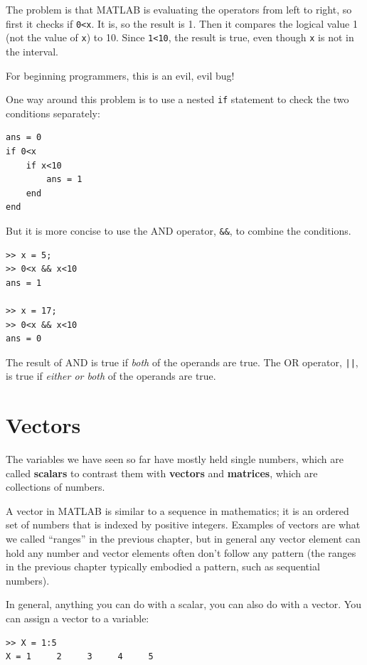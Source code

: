 \documentclass[
]{book}
\begin{document}
The problem is that MATLAB is evaluating the operators from left
to right, so first it checks if {\tt 0<x}.  It is, so the result
is 1.  Then it compares the logical value 1 (not the value of
{\tt x}) to 10.  Since {\tt 1<10}, the result is true, even though
{\tt x} is not in the interval.

For beginning programmers, this is an evil, evil bug!

One way around this problem is to use a nested {\tt if} statement to
check the two conditions separately:

\begin{verbatim}
ans = 0
if 0<x
    if x<10
        ans = 1
    end
end
\end{verbatim}

But it is more concise to use the AND operator, {\tt \&\&}, to
combine the conditions.

\begin{verbatim}
>> x = 5;
>> 0<x && x<10
ans = 1

>> x = 17;
>> 0<x && x<10
ans = 0
\end{verbatim}

The result of AND is true if {\em both} of the operands are
true.  The OR operator, {\tt ||}, is true if {\em either or both}
of the operands are true.


\section{Vectors}

The variables we have seen so far have mostly held single numbers,
which are called {\bf scalars} to contrast them with {\bf vectors}
and {\bf matrices}, which are collections of numbers.

A vector in MATLAB is similar to a sequence in mathematics;
it is an ordered set of numbers that is indexed by positive integers.
Examples of vectors are what we called ``ranges'' in the previous chapter,
but in general any vector element can hold any number and vector elements
often don't follow any pattern (the ranges in the previous chapter
typically embodied a pattern, such as sequential numbers).  

In general, anything you can do with a scalar, you can also do with
a vector.  You can assign a vector to a variable:

\begin{verbatim}
>> X = 1:5
X = 1     2     3     4     5
\end{verbatim}
\end{document}
